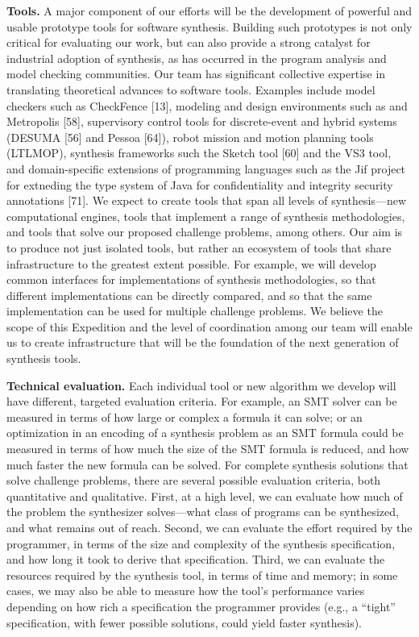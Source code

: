 \textbf{Tools.} A major component of our efforts will be the development of powerful and usable prototype tools for software synthesis. Building such prototypes is not only critical for evaluating our work, but can also provide a strong catalyst for industrial adoption of synthesis, as has occurred in the program analysis and model checking communities. Our team has significant collective expertise in translating theoretical advances to software tools. Examples include model checkers such as CheckFence [13], modeling and design environments such as and Metropolis [58], supervisory control tools for discrete-event and hybrid systems (DESUMA [56] and Pessoa [64]), robot mission and motion planning tools (LTLMOP), synthesis frameworks such the Sketch tool [60] and the VS3 tool, and domain-specific extensions of programming languages such as the Jif project for extneding the type system of Java for confidentiality and integrity security annotations [71]. We expect to create tools that span all levels of synthesis—new computational engines, tools that implement a range of synthesis methodologies, and tools that solve our proposed challenge problems, among others. Our aim is to produce not just isolated tools, but rather an ecosystem of tools that share infrastructure to the greatest extent possible. For example, we will develop common interfaces for implementations of synthesis methodologies, so that different implementations can be directly compared, and so that the same implementation can be used for multiple challenge problems. We believe the scope of this Expedition and the level of coordination among our team will enable us to create infrastructure that will be the foundation of the next generation of synthesis tools.


\textbf{Technical evaluation.} Each individual tool or new algorithm we develop will have different, targeted evaluation criteria. For example, an SMT solver can be measured in terms of how large or complex a formula it can solve; or an optimization in an encoding of a synthesis problem as an SMT formula could be measured in terms of how much the size of the SMT formula is reduced, and how much faster the new formula can be solved. For complete synthesis solutions that solve challenge problems, there are several possible evaluation criteria, both quantitative and qualitative. First, at a high level, we can evaluate how much of the problem the synthesizer solves—what class of programs can be synthesized, and what remains out of reach. Second, we can evaluate the effort required by the programmer, in terms of the size and complexity of the synthesis specification, and how long it took to derive that specification. Third, we can evaluate the resources required by the synthesis tool, in terms of time and memory; in some cases, we may also be able to measure how the tool’s performance varies depending on how rich a specification the programmer provides (e.g., a “tight” specification, with fewer possible solutions, could yield faster synthesis).








